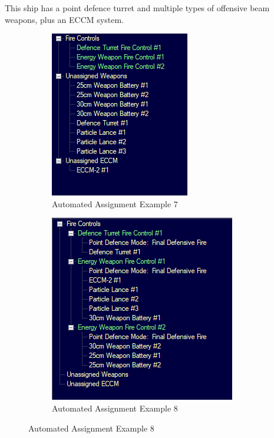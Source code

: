 \documentclass[../Aurora C# unofficial manual.tex]{subfiles}
\begin{document}
	This ship has a point defence turret and multiple types of offensive beam weapons, plus an ECCM system.
	\begin{figure}[H]
		\centering
		\begin{subfigure}{.5\textwidth}
			\centering
			\includegraphics[width=0.5\linewidth]{images/AutomatedAssignment7}
			\caption[Automated Assignment]{Automated Assignment Example 7}
			\label{fig:automatedassignment7}
		\end{subfigure}%
		\begin{subfigure}{.5\textwidth}
			\centering
			\includegraphics[width=0.5\linewidth]{images/AutomatedAssignment8}
			\caption[Automated Assignment]{Automated Assignment Example 8}
			\label{fig:automatedassignment8}
		\end{subfigure}
	\end{figure}
\end{document}
